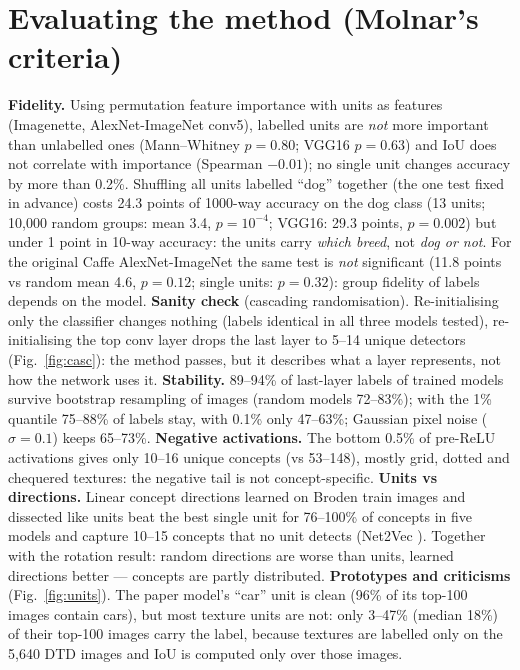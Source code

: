 \documentclass[10pt,a4paper]{article}
\begin{document}
\section{Evaluating the method (Molnar's criteria)}
\textbf{Fidelity.} Using permutation feature importance with units as features (Imagenette, AlexNet-ImageNet conv5),
labelled units are \emph{not} more important than unlabelled ones (Mann--Whitney $p=0.80$; VGG16 $p=0.63$) and IoU does not
correlate with importance (Spearman $-0.01$); no single unit changes accuracy by more than 0.2\%. Shuffling all units labelled
``dog'' together (the one test fixed in advance) costs 24.3 points of 1000-way accuracy on the dog class (13 units; 10{,}000
random groups: mean 3.4, $p=10^{-4}$; VGG16: 29.3 points, $p=0.002$) but under 1 point in 10-way accuracy: the units carry
\emph{which breed}, not \emph{dog or not}. For the original Caffe AlexNet-ImageNet the same test is \emph{not} significant
(11.8 points vs random mean 4.6, $p=0.12$; single units: $p=0.32$): group fidelity of labels depends on the model.
\textbf{Sanity check} (cascading randomisation). Re-initialising only the classifier changes nothing (labels identical in all
three models tested), re-initialising the top conv layer drops the last layer to 5--14 unique detectors (Fig.~\ref{fig:casc}):
the method passes, but it describes what a layer represents, not how the network uses it.
\textbf{Stability.} 89--94\% of last-layer labels of trained models survive bootstrap resampling of images (random models 72--83\%); with the 1\% quantile 75--88\% of labels
stay, with 0.1\% only 47--63\%; Gaussian pixel noise ($\sigma=0.1$) keeps 65--73\%.
\textbf{Negative activations.} The bottom 0.5\% of pre-ReLU activations gives only 10--16 unique concepts (vs 53--148), mostly
grid, dotted and chequered textures: the negative tail is not concept-specific.
\textbf{Units vs directions.} Linear concept directions learned on Broden train images and dissected like units beat the best
single unit for 76--100\% of concepts in five models and capture 10--15 concepts that no unit detects (Net2Vec \cite{net2vec}).
Together with the rotation result: random directions are worse than units, learned directions better --- concepts are partly
distributed.
\textbf{Prototypes and criticisms} (Fig.~\ref{fig:units}). The paper model's ``car'' unit is clean (96\% of its top-100
images contain cars), but most texture units are not: only 3--47\% (median 18\%) of their top-100 images carry the label,
because textures are labelled only on the 5{,}640 DTD images and IoU is computed only over those images.
\end{document}
